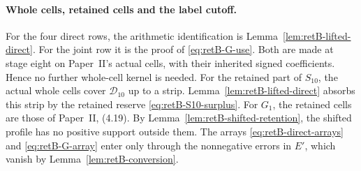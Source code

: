 \paragraph{Whole cells, retained cells and the label cutoff.}
For the four direct rows, the arithmetic identification is
Lemma~\ref{lem:retB-lifted-direct}. For the joint row it is the proof of
\eqref{eq:retB-G-use}. Both are made at stage eight on Paper~II's actual
cells, with their inherited signed coefficients. Hence no further whole-cell
kernel is needed. For the retained part of $S_{10}$, the actual whole cells
cover $\mathcal D_{10}$ up to a strip. Lemma~\ref{lem:retB-lifted-direct}
absorbs this strip by the retained reserve \eqref{eq:retB-S10-surplus}. For
$G_1$, the retained cells are those of Paper~II, (4.19). By
Lemma~\ref{lem:retB-shifted-retention}, the shifted profile has
no positive support outside them. The arrays \eqref{eq:retB-direct-arrays}
and \eqref{eq:retB-G-array} enter only through the nonnegative errors in
$E'$, which vanish by Lemma~\ref{lem:retB-conversion}.

